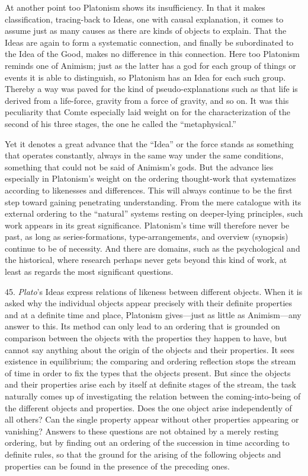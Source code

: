 \documentclass[12pt,a4paper]{book}
\newcommand{\opage}[1]{\marginnote{\footnotesize\textit{[#1]}}}
\begin{document}
At another point too Platonism shows its insufficiency. In that it makes
classification, tracing-back to Ideas, one with causal explanation, it
comes to assume just as many causes as there are kinds of objects to
explain. That the Ideas are again to form a systematic connection, and
finally be subordinated to the Idea of the Good, makes no difference in
this connection. Here too Platonism reminds one of Animism; just as the
latter has a god for each group of things or events it is able to
distinguish, so Platonism has an Idea for each such group. Thereby a way
was paved for the kind of pseudo-explanations such as that life is derived
from a life-force, gravity from a force of gravity, and so on. It was this
peculiarity that Comte especially laid weight on for the characterization
of the second of his three stages, the one he called the ``metaphysical.''

Yet it denotes a great advance that the ``Idea'' or the force stands as
something that operates constantly, always in the same way under the same
conditions, something that could not be said of Animism's gods. But the
advance lies especially in \opage{121}Platonism's weight on the ordering thought-work
that systematizes according to likenesses and differences. This will always
continue to be the first step toward gaining penetrating understanding.
From the mere catalogue with its external ordering to the ``natural''
systems resting on deeper-lying principles, such work appears in its great
significance. Platonism's time will therefore never be past, as long as
series-formations, type-arrangements, and overview (synopsis) continue to
be of necessity. And there are domains, such as the psychological and the
historical, where research perhaps never gets beyond this kind of work, at
least as regards the most significant questions.

45. \emph{Plato}'s Ideas express relations of likeness between different
objects. When it is asked why the individual objects appear precisely with
their definite properties and at a definite time and place, Platonism
gives---just as little as Animism---any answer to this. Its method can only
lead to an ordering that is grounded on comparison between the objects with
the properties they happen to have, but cannot say anything about the
origin of the objects and their properties. It sees existence in
equilibrium; the comparing and ordering reflection stops the stream of time
in order to fix the types that the objects present. But since the objects
and their properties arise each by itself at definite stages of the stream,
the task naturally comes up of investigating the relation between the
coming-into-being of the different objects and properties. Does the one
object arise independently of all others? Can the single property appear
without other properties appearing or vanishing? Answers to these questions
are not obtained by a merely resting ordering, but by finding out an
ordering of the succession in time according to definite rules, so that the
ground for the arising of the following objects and properties can be found
in the presence of the preceding ones.
\end{document}
